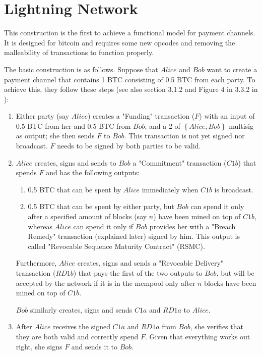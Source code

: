 \section{Lightning Network}
  This construction is the first to achieve a functional model for payment channels. It
  is designed for bitcoin and requires some new opcodes and removing the malleability of
  transactions to function properly.

  The basic construction is as follows. Suppose that $Alice$ and $Bob$ want to create a
  payment channel that contains 1 BTC consisting of 0.5 BTC from each party. To achieve
  this, they follow these steps (see also section 3.1.2 and Figure 4 in 3.3.2 in
  \cite{lightning}):
  \begin{enumerate}
    \item Either party (say $Alice$) creates a "Funding" transaction ($F$) with an input
    of 0.5 BTC from her and 0.5 BTC from $Bob$, and a 2-of-$\left\{Alice, Bob\right\}$
    multisig as output; she then sends $F$ to $Bob$. This transaction is not yet signed
    nor broadcast. $F$ needs to be signed by both parties to be valid.

    \item $Alice$ creates, signs and sends to $Bob$ a "Commitment" transaction ($C1b$)
    that spends $F$ and has the following outputs:
    \begin{enumerate}
      \item 0.5 BTC that can be spent by $Alice$ immediately when $C1b$ is broadcast.
      \item 0.5 BTC that can be spent by either party, but $Bob$ can spend it only after
      a specified amount of blocks (say $n$) have been mined on top of $C1b$, whereas
      $Alice$ can spend it only if $Bob$ provides her with a "Breach Remedy" transaction
      (explained later) signed by him. This output is called "Revocable Sequence Maturity
      Contract" (RSMC).
    \end{enumerate}
    Furthermore, $Alice$ creates, signs and sends a "Revocable Delivery" transaction
    ($RD1b$) that pays the first of the two outputs to $Bob$, but will be accepted by the
    network if it is in the mempool only after $n$ blocks have been mined on top of $C1b$.

    $Bob$ similarly creates, signs and sends $C1a$ and $RD1a$ to $Alice$.

    \item After $Alice$ receives the signed $C1a$ and $RD1a$ from $Bob$, she verifies that
    they are both valid and correctly spend $F$. Given that everything works out right,
    she signs $F$ and sends it to $Bob$.


\end{enumerate}
